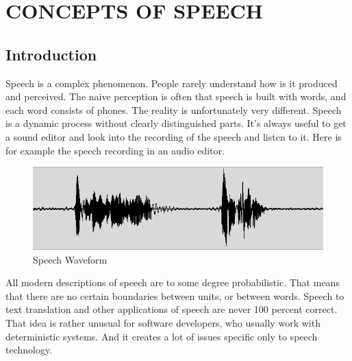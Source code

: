 \documentclass[12pt,a4paper,oldfontcommands]{memoir}
\begin{document}






\chapter{ CONCEPTS OF SPEECH}

\section{Introduction}
Speech is a complex phenomenon. People rarely understand how is it produced and perceived. The naive perception is often that speech is built with words, and each word consists of phones. The reality is unfortunately very different. Speech is a dynamic process without clearly distinguished parts. It's always useful to get a sound editor and look into the recording of the speech and listen to it. Here is for example the speech recording in an audio editor.

\begin{figure}[h]
    \centering
    \includegraphics[scale=0.5]{waveform}
    \caption{Speech Waveform}
\end{figure}

All modern descriptions of speech are to some degree probabilistic. That means that there are no certain boundaries between units, or between words. Speech to text translation and other applications of speech are never 100 percent correct. That idea is rather unusual for software developers, who usually work with deterministic systems. And it creates a lot of issues specific only to speech technology\cite{4}. 
\end{document}
